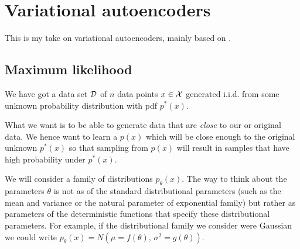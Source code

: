 
\clearpage

\section{Variational autoencoders}\label{sec:Vae}

This is my take on variational autoencoders, mainly based on \cite{Doersch2016, Kingma2017, JaanVae}.

\subsection{Maximum likelihood}\label{sec:Vae_maxLikelihood}



We have got a data set $\mathcal{D}$ of $n$ data points $x \in \mathcal{X}$ generated i.i.d. from some unknown probability distribution with pdf $p^*(x)$.


What we want is to be able to generate data that are \emph{close} to our or original data. 
We hence want to learn a $p(x)$ which will be close enough to the original unknown $p^*(x)$ so that sampling from $p(x)$ will result in samples that have high probability under $p^*(x)$.


We will consider a family of distributions $p_{\theta}(x)$. 
The way to think about the parameters $\theta$ is not as of the standard distributional parameters (such as the mean and variance or the natural parameter of exponential family) but rather as parameters of the deterministic functions that specify these distributional parameters.
For example, if the distributional family we consider were Gaussian we could write $p_{\theta}(x) = N(\mu = f(\theta), \, \sigma^2 = g(\theta))$.


